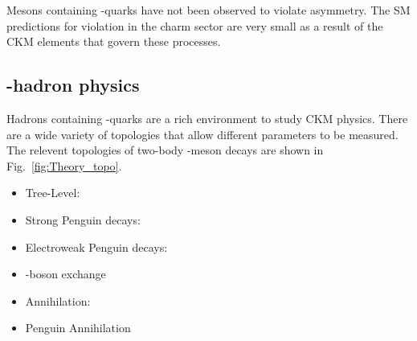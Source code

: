 Mesons containing \cquark-quarks have not been observed to violate \CP asymmetry. The SM predictions for \CP violation in the charm sector are very small as a result of the CKM elements that govern these processes.     


\subsection{\bquark-hadron physics}
Hadrons containing \bquark-quarks are a rich environment to study CKM physics. 
There are a wide variety of topologies that allow different parameters to be measured.
The relevent topologies of two-body \bquark-meson decays are shown in Fig.~\ref{fig:Theory_topo}. 

\begin{itemize}
\item Tree-Level: 
\item Strong Penguin decays:
\item Electroweak Penguin decays:
\item \W-boson exchange
\item Annihilation: 
\item Penguin Annihilation
\end{itemize}

